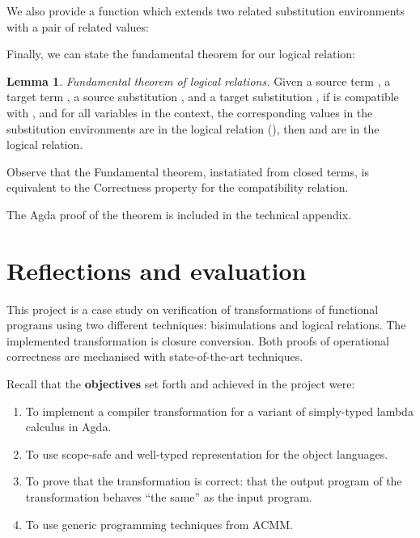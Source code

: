 \documentclass[bsc,frontabs,oneside,singlespacing,parskip,deptreport]{infthesis}
\theoremstyle{definition}
\theoremstyle{lemma}
\newtheorem*{lemma}{Lemma}
\begin{document}

We also provide a function  which extends two related
substitution environments with a pair of related values:


Finally, we can state the fundamental theorem for our logical
relation:

\begin{lemma}
  \emph{Fundamental theorem of logical relations.} Given a source
  term , a target term , a source substitution
  , and a target substitution , if  is
  compatible with , and for all variables  in the
  context, the corresponding values in the substitution environments
  are in the logical relation (), then
   and  are in the
  logical relation.
\end{lemma}


Observe that the Fundamental theorem, instatiated from closed terms,
is equivalent to the Correctness property for the compatibility relation.

The Agda proof of the theorem is included in the technical appendix.

\chapter{Reflections and evaluation}
\label{cha:refl-eval}

This project is a case study on verification of transformations of
functional programs using two different techniques: bisimulations and
logical relations. The implemented transformation is closure
conversion. Both proofs of operational correctness are mechanised with
state-of-the-art techniques.

Recall that the \textbf{objectives} set forth and achieved in the
project were:

\begin{enumerate}
\item To implement a compiler transformation for a variant of
  simply-typed lambda calculus in Agda.
\item To use scope-safe and well-typed representation for the object
  languages.
\item To prove that the transformation is correct: that the output
  program of the transformation behaves ``the same'' as the input
  program.
\item To use generic programming techniques from ACMM.
\end{enumerate}
\end{document}
